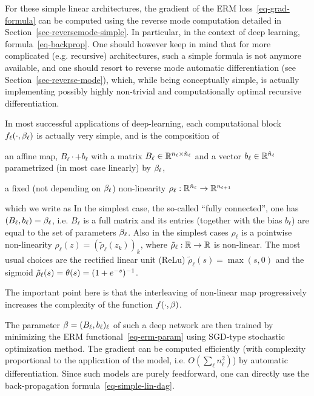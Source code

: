 For these simple linear architectures, the gradient of the ERM loss~\eqref{eq-grad-formula} can be computed using the reverse mode computation detailed in Section~\ref{sec-reversemode-simple}. In particular, in the context of deep learning, formula~\eqref{eq-backprop}. One should however keep in mind that for more complicated (e.g. recursive) architectures, such a simple formula is not anymore available, and one should resort to reverse mode automatic differentiation (see Section~\ref{sec-reverse-mode}), which, while being conceptually simple, is actually implementing possibly highly non-trivial and computationally optimal recursive differentiation. 

In most successful applications of deep-learning, each computational block $f_{\ell}(\cdot,\beta_\ell)$ is actually very simple, and is the composition of 
\begin{rs}
	\item an affine map, $B_\ell \cdot + b_\ell$ with a matrix $B_\ell \in \mathbb{R}^{n_\ell \times \tilde n_{\ell}}$ and a vector $b_\ell \in \mathbb{R}^{\tilde n_\ell}$ parametrized (in most case linearly) by $\beta_\ell$, 
	\item a fixed (not depending on $\beta_\ell$) non-linearity $\rho_\ell : \mathbb{R}^{\tilde n_{\ell}} \rightarrow \mathbb{R}^{n_{\ell+1}}$
\end{rs}
which we write as
In the simplest case, the so-called ``fully connected'', one has $(B_\ell,b_\ell)=\beta_\ell$, i.e. $B_\ell$ is a full matrix and its entries (together with the bias $b_\ell$) are equal to the set of parameters $\beta_\ell$. 
%
Also in the simplest cases $\rho_\ell$ is a pointwise non-linearity $\rho_\ell(z)=(\tilde\rho_\ell(z_k))_k$, where $\tilde\rho_\ell : \mathbb{R} \rightarrow \mathbb{R}$ is non-linear. The most usual choices are the rectified linear unit (ReLu) $\tilde\rho_\ell(s)=\max(s,0)$ and the sigmoid $\tilde\rho_\ell(s)=\theta(s) = (1+e^{-s})^{-1}$.

The important point here is that the interleaving of non-linear map progressively increases the complexity of the function $f(\cdot,\beta)$.

The parameter $\beta = (B_\ell,b_\ell)_\ell$ of such a deep network are then trained by minimizing the ERM functional~\eqref{eq-erm-param} using SGD-type stochastic optimization method. The gradient can be computed efficiently (with complexity proportional to the application of the model, i.e. $O(\sum_\ell n_\ell^2)$) by automatic differentiation. Since such models are purely feedforward, one can directly use the back-propagation formula~\eqref{eq-simple-lin-dag}.

